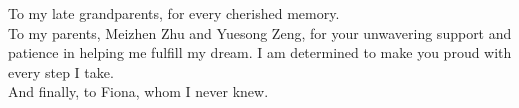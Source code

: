 \begin{dedication}
To my late grandparents, for every cherished memory.\\ 
To my parents, Meizhen Zhu and Yuesong Zeng, for your unwavering support and patience in helping me fulfill my dream. I am determined to make you proud with every step I take.\\
And finally, to Fiona, whom I never knew.
\end{dedication}
